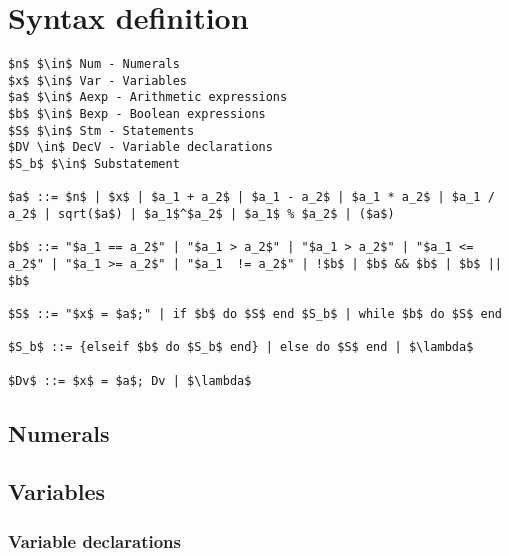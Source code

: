 \section{Syntax definition}\label{sec:anlysis:syntax-definition}
\begin{lstlisting}[mathescape, captionpos=b, caption={Syntax formation rules}, label={lst:syntax-formation}]
$n$ $\in$ Num - Numerals
$x$ $\in$ Var - Variables
$a$ $\in$ Aexp - Arithmetic expressions
$b$ $\in$ Bexp - Boolean expressions
$S$ $\in$ Stm - Statements
$DV \in$ DecV - Variable declarations
$S_b$ $\in$ Substatement

$a$ ::= $n$ | $x$ | $a_1 + a_2$ | $a_1 - a_2$ | $a_1 * a_2$ | $a_1 / a_2$ | sqrt($a$) | $a_1$^$a_2$ | $a_1$ % $a_2$ | ($a$)

$b$ ::= "$a_1 == a_2$" | "$a_1 > a_2$" | "$a_1 > a_2$" | "$a_1 <= a_2$" | "$a_1 >= a_2$" | "$a_1  != a_2$" | !$b$ | $b$ && $b$ | $b$ || $b$

$S$ ::= "$x$ = $a$;" | if $b$ do $S$ end $S_b$ | while $b$ do $S$ end

$S_b$ ::= {elseif $b$ do $S_b$ end} | else do $S$ end | $\lambda$

$Dv$ ::= $x$ = $a$; Dv | $\lambda$
\end{lstlisting}

\subsection{Numerals}

\subsection{Variables}

\subsubsection{Variable declarations}

